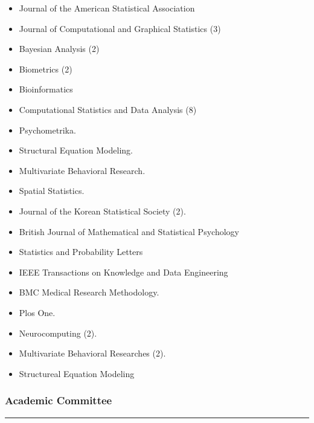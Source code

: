 \documentclass[]{book}
\providecommand{\tightlist}{%
  \setlength{\itemsep}{0pt}\setlength{\parskip}{0pt}}
\begin{document}
\begin{itemize}
\tightlist
\item
  Journal of the American Statistical Association
\item
  Journal of Computational and Graphical Statistics (3)
\item
  Bayesian Analysis (2)
\item
  Biometrics (2)
\item
  Bioinformatics
\item
  Computational Statistics and Data Analysis (8)
\item
  Psychometrika.
\item
  Structural Equation Modeling.
\item
  Multivariate Behavioral Research.
\item
  Spatial Statistics.
\item
  Journal of the Korean Statistical Society (2).
\item
  British Journal of Mathematical and Statistical Psychology
\item
  Statistics and Probability Letters
\item
  IEEE Transactions on Knowledge and Data Engineering
\item
  BMC Medical Research Methodology.
\item
  Plos One.
\item
  Neurocomputing (2).
\item
  Multivariate Behavioral Researches (2).
\item
  Structureal Equation Modeling
\end{itemize}

\hypertarget{academic-committee}{%
\subsubsection*{Academic Committee}\label{academic-committee}}

\begin{center}\rule{0.5\linewidth}{0.5pt}\end{center}
\end{document}

